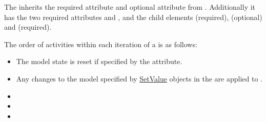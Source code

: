 
The  inherits the required attribute \hyperref[sec:id]{} and optional attribute \hyperref[sec:name]{} from \AbstractTask. Additionally it has the two required attributes \hyperref[sec:rangeAttribute]{} and \hyperref[sec:resetModel]{},  and the child elements \hyperref[class:listOfRanges]{} (required), \hyperref[sec:changesRepeatedTask]{} (optional) and \hyperref[class:subTask]{} (required).

The order of activities within each iteration of a  is as follows:
\begin{itemize} 
	\item The  model state  is reset if specified by the \hyperref[sec:resetModel]{} attribute.
	\item Any changes to the model  specified by \hyperref[class:setValue]{SetValue} objects in the \hyperref[sec:changesRepeatedTask]{} are applied to  \Model.
\end{itemize}

\begin{itemize}
        \item {}
        \item {}
        \item {}

\end{itemize}


